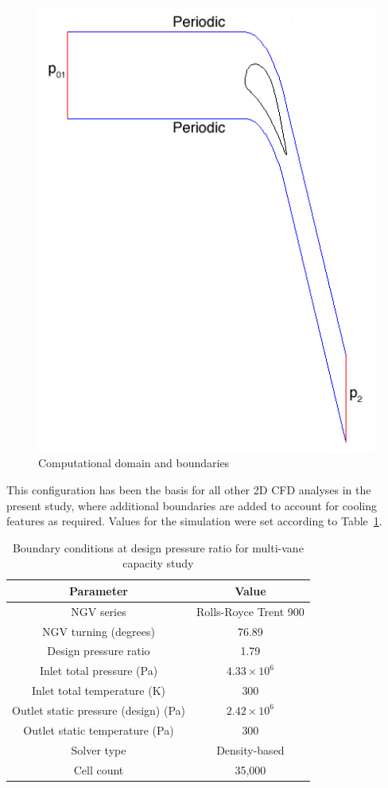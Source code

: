 \documentclass[a4paper, 11pt, twoside]{report}
\begin{document}
\begin{figure}[H]
	\centering
	\includegraphics[width=.6\textwidth]{figs/domain_boundary_conditions.png}
	\caption{Computational domain and boundaries}
	\label{fig:computational_domain_and_boundaries}
\end{figure}

This configuration has been the basis for all other 2D CFD analyses in the present study, where additional boundaries are added to account for cooling features as required. Values for the simulation were set according to Table~\ref{T900_parameters}.

\begin{table}[H]
\caption{Boundary conditions at design pressure ratio for multi-vane capacity study}
\label{T900_parameters}
\begin{center}
\begin{tabular}{|c|c|}
\hline
Parameter & Value\\
\hline
NGV series & Rolls-Royce Trent 900\\
NGV turning (degrees) & 76.89\\
Design pressure ratio & 1.79\\
Inlet total pressure (Pa) & $4.33 \times 10^6$\\
Inlet total temperature (K) & 300\\
Outlet static pressure (design) (Pa) & $2.42 \times 10^6$\\
Outlet static temperature (Pa) & 300\\
Solver type & Density-based\\
Cell count & 35,000\\
\hline
\end{tabular}
\end{center}
\end{table}
\end{document}
